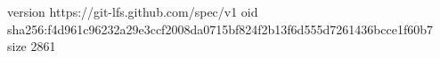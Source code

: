 version https://git-lfs.github.com/spec/v1
oid sha256:f4d961c96232a29e3ccf2008da0715bf824f2b13f6d555d7261436bcce1f60b7
size 2861
